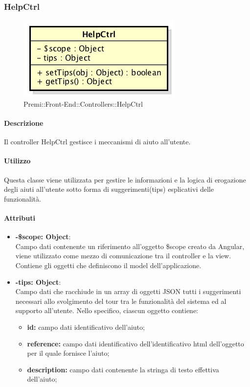 \newpage

\subsubsection{HelpCtrl}
\begin{figure}[h]
	\centering
	\includegraphics[width=0.4\linewidth]{img/premi_front_end_controllers_helpctrl}
	\caption[Premi::Front-End::Controllers::HelpCtrl]{Premi::Front-End::Controllers::HelpCtrl}
\end{figure}
      \paragraph{Descrizione}
	Il controller HelpCtrl gestisce i meccanismi di aiuto all'utente.

	\paragraph{Utilizzo}
	Questa classe viene utilizzata per gestire le informazioni e la logica di erogazione degli aiuti all'utente sotto forma di suggerimenti(tips) esplicativi delle funzionalità.

	\paragraph{Attributi}
	\begin{itemize}
		\item \textbf{-\$scope: Object}:\\
				Campo dati contenente un riferimento all'oggetto \$scope creato da Angular, viene utilizzato come mezzo di comunicazione tra il controller e la view. Contiene gli oggetti che definiscono il model dell'applicazione.
		\item \textbf{-tips: Object}:\\
				Campo dati che racchiude in un array di oggetti JSON tutti i suggerimenti necessari allo svolgimento del tour tra le funzionalità del sistema ed al supporto all'utente.
				Nello specifico, ciascun  oggetto contiene:
				\begin{itemize}
					\item \textbf{id:} campo dati identificativo dell'aiuto;
					\item \textbf{reference:} campo dati identificativo dell'identificativo html dell'oggetto per il quale fornisce l'aiuto;
					\item \textbf{description:} campo dati contenente la stringa di testo effettiva dell'aiuto;
				\end{itemize}
	\end{itemize}

